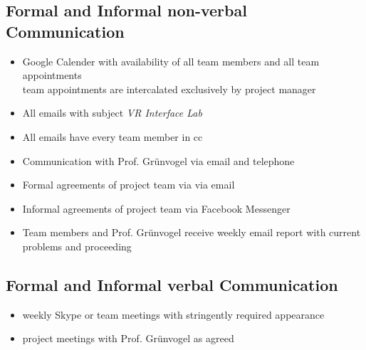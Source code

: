 \documentclass[a4paper, 12pt]{article}
\begin{document}
\subsection{Formal and Informal non-verbal Communication}
\begin{itemize}
\item Google Calender with availability of all team members and all team appointments\\
team appointments are  intercalated exclusively by project manager
\item All emails with subject \textit{VR Interface Lab} 
\item All emails have every team member in cc
\item Communication with Prof. Grünvogel via email and telephone
\item Formal agreements of project team via via email
\item Informal agreements of project team via Facebook Messenger
\item Team members and Prof. Grünvogel receive weekly email report with current problems and proceeding 
\end{itemize}
\subsection{Formal and Informal verbal Communication}
\begin{itemize}
	\item weekly Skype or team meetings with stringently required appearance
	\item project meetings with Prof. Grünvogel as agreed 
	
\end{itemize}
\end{document}
